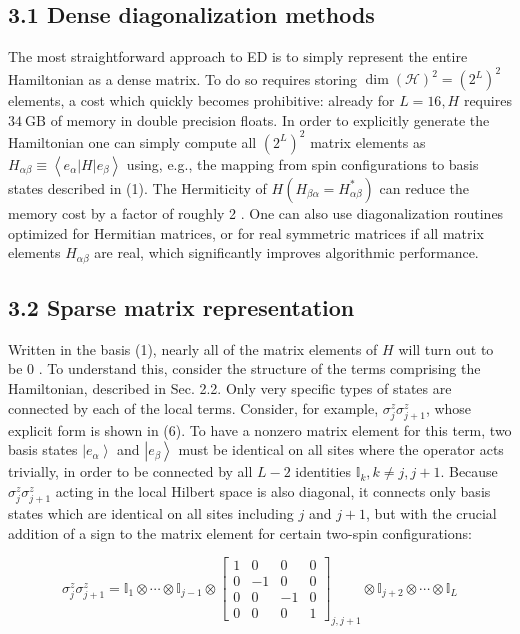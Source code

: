 \documentclass[10pt]{article}
\begin{document}
\subsection*{3.1 Dense diagonalization methods}
The most straightforward approach to ED is to simply represent the entire Hamiltonian as a dense matrix. To do so requires storing $\operatorname{dim}(\mathcal{H})^{2}=\left(2^{L}\right)^{2}$ elements, a cost which quickly becomes prohibitive: already for $L=16, H$ requires $34 \mathrm{~GB}$ of memory in double precision floats. In order to explicitly generate the Hamiltonian one can simply compute all $\left(2^{L}\right)^{2}$ matrix elements as $H_{\alpha \beta} \equiv\left\langle e_{\alpha}|H| e_{\beta}\right\rangle$ using, e.g., the mapping from spin configurations to basis states described in (1). The Hermiticity of $H\left(H_{\beta \alpha}=H_{\alpha \beta}^{*}\right)$ can reduce the memory cost by a factor of roughly 2 . One can also use diagonalization routines optimized for Hermitian matrices, or for real symmetric matrices if all matrix elements $H_{\alpha \beta}$ are real, which significantly improves algorithmic performance.

\subsection*{3.2 Sparse matrix representation}
Written in the basis (1), nearly all of the matrix elements of $H$ will turn out to be 0 . To understand this, consider the structure of the terms comprising the Hamiltonian, described in Sec. 2.2. Only very specific types of states are connected by each of the local terms. Consider, for example, $\sigma_{j}^{z} \sigma_{j+1}^{z}$, whose explicit form is shown in (6). To have a nonzero matrix element for this term, two basis states $\left|e_{\alpha}\right\rangle$ and $\left|e_{\beta}\right\rangle$ must be identical on all sites where the operator acts trivially, in order to be connected by all $L-2$ identities $\mathbb{I}_{k}, k \neq j, j+1$. Because $\sigma_{j}^{z} \sigma_{j+1}^{z}$ acting in the local Hilbert space is also diagonal, it connects only basis states which are identical on all sites including $j$ and $j+1$, but with the crucial addition of a sign to the matrix element for certain two-spin configurations:

\[
\sigma_{j}^{z} \sigma_{j+1}^{z}=\mathbb{I}_{1} \otimes \cdots \otimes \mathbb{I}_{j-1} \otimes\left[\begin{array}{cccc}
1 & 0 & 0 & 0  \tag{10}\\
0 & -1 & 0 & 0 \\
0 & 0 & -1 & 0 \\
0 & 0 & 0 & 1
\end{array}\right]_{j, j+1} \otimes \mathbb{I}_{j+2} \otimes \cdots \otimes \mathbb{I}_{L}
\]
\end{document}
